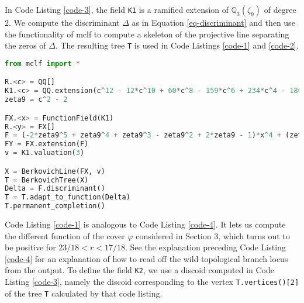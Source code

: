 \documentclass[11pt]{amsart}
\renewcommand{\phi}{\varphi}
\newcommand{\BQ}{{\mathbb{Q}}}
\theoremstyle{definition}
\begin{document}
In Code Listing \ref{code-3}, the field \texttt{K1} is a ramified extension of $\BQ_3(\zeta_9)$ of degree $2$. We compute the discriminant $\Delta$ as in Equation \eqref{eq-discriminant} and then use the functionality of mclf to compute a skeleton of the projective line separating the zeros of $\Delta$. The resulting tree \texttt{T} is used in Code Listings \ref{code-1} and \ref{code-2}.
\begin{lstlisting}[language=Python, label={code-3},caption=SageMath program. Used to compute a skeleton of the projective line separating branch points]
from mclf import *

R.<c> = QQ[]
K1.<c> = QQ.extension(c^12 - 12*c^10 + 60*c^8 - 159*c^6 + 234*c^4 - 180*c^2 + 57)
zeta9 = c^2 - 2

FX.<x> = FunctionField(K1)
R.<y> = FX[]
F = (-2*zeta9^5 + zeta9^4 + zeta9^3 - zeta9^2 + 2*zeta9 - 1)*x^4 + (zeta9^5 + zeta9^3 + zeta9^2)*x^3*y + (24*zeta9^5 - 6*zeta9^4 + 15*zeta9^3 + 12*zeta9^2 + 15)*x^3 + (9*zeta9^4)*x^2*y + y^3 + (-45*zeta9^5 + 9*zeta9^4 - 18*zeta9^3 + 45*zeta9^2 - 63*zeta9 - 36)*x^2 + (9*zeta9^5 - 27*zeta9^4 - 18*zeta9^3 + 18*zeta9^2 - 36)*x*y + (135*zeta9^5 + 135*zeta9^4 - 135*zeta9^3 - 54*zeta9^2 + 270*zeta9 - 27)*x + (9*zeta9^5 + 54*zeta9^4 + 18*zeta9^3 - 36*zeta9^2 + 27*zeta9 + 63)*y + (-189*zeta9^5 - 81*zeta9^4 + 279*zeta9^3 - 108*zeta9^2 - 270*zeta9 + 72)
FY = FX.extension(F)
v = K1.valuation(3)

X = BerkovichLine(FX, v)
T = BerkovichTree(X)
Delta = F.discriminant()
T = T.adapt_to_function(Delta)
T.permanent_completion()
\end{lstlisting}


Code Listing \ref{code-1} is analogous to Code Listing \ref{code-4}. It lets us compute the different function of the cover $\phi$ considered in Section 3, which turns out to be positive for $23/18<r<17/18$. See the explanation preceding Code Listing \ref{code-4} for an explanation of how to read off the wild topological branch locus from the output. To define the field \texttt{K2}, we use a discoid computed in Code Listing \ref{code-3}, namely the discoid corresponding to the vertex \texttt{T.vertices()[2]} of the tree \texttt{T} calculated by that code listing.
\end{document}
